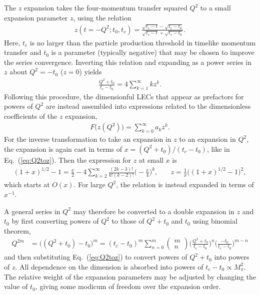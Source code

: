 The $z$ expansion takes the four-momentum transfer squared $Q^2$
 to a small expansion parameter $z$, using the relation
\begin{align}
 z(t=-Q^2;t_0,t_c) = \frac{\sqrt{t_c-t} -\sqrt{t_c-t_0}}{ \sqrt{t_c-t} +\sqrt{t_c-t_0}}.
\end{align}
Here, $t_c$ is no larger than the particle production threshold in timelike momentum transfer
 and $t_0$ is a parameter (typically negative) that
 may be chosen to improve the series convergence.
Inverting this relation and expanding as a power series in $z$ about $Q^2=-t_0$ ($z=0$) yields
\begin{align}
 \frac{Q^2+t_0}{t_c-t_0} = 4 \sum_{k=1}^\infty k z^k.
 \label{eq:Q2toz}
\end{align}
Following this procedure, the dimensionful LECs that appear as prefactors for powers of $Q^2$
 are instead assembled into expressions related to the dimensionless
 coefficients of the $z$ expansion,
\begin{align}
 F\big(z(Q^2)\big) = \sum_{k=0}^\infty a_k z^k.
 \label{eq:zexp}
\end{align}
%
For the inverse transformation to take an expansion in $z$ to an expansion in $Q^2$,
 the expansion is again cast in terms of $x=(Q^2+t_0)/(t_c-t_0)$, like in Eq.~(\ref{eq:Q2toz}).
Then the expression for $z$ at small $x$ is
\begin{align}
 (1+x)^{1/2} -1 = \frac{x}{2}
 -4\sum_{k=2}^\infty \frac{(2k-3)!}{k!(k-2)!} \biggr( -\frac{x}{4} \biggr)^{k},
 &\quad
 z = \frac{1}{x} \big( (1+x)^{1/2} -1 \big)^2,
 \label{eq:ztoQ2}
\end{align}
 which starts at $O(x)$.
For large $Q^2$, the relation is instead expanded in terms of $x^{-1}$.

A general series in $Q^2$ may therefore be converted to a double expansion in $z$ and $t_0$
 by first converting powers of $Q^2$ to those of $Q^2+t_0$ and $t_0$ using binomial theorem,
\begin{align}
 Q^{2m} &= \big( (Q^2+t_0) -t_0 \big)^m
 = (t_c-t_0)^m
 \sum_{n=0}^{m} \left( \begin{array}{c} m \\ n \end{array} \right)
 \biggr( \frac{Q^2+t_0}{t_c-t_0} \biggr)^n \biggr( \frac{-t_0}{t_c-t_0} \biggr)^{m-n}
\end{align}
 and then substituting Eq.~(\ref{eq:Q2toz}) to convert powers of $Q^2+t_0$
 into powers of $z$.
All dependence on the dimension is absorbed into powers of $t_c-t_0 \propto M_\pi^2$.
The relative weight of the expansion parameters may be adjusted by changing
 the value of $t_0$, giving some modicum of freedom over the expansion order.


